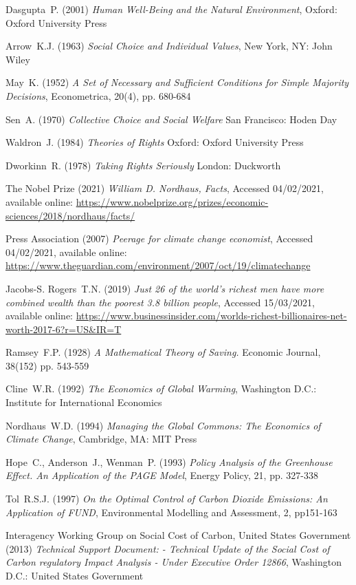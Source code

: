 \documentclass[11pt, oneside]{article}   	%
\begin{document}
\begin{thebibliography}{99}
 Dasgupta~P. (2001)
\emph{Human Well-Being and the Natural Environment},
Oxford: Oxford University Press
	
 Arrow~K.J. (1963)
\emph{Social Choice and Individual Values},
New York, NY: John Wiley
	
 May~K. (1952)
\emph{A Set of Necessary and Sufficient Conditions for Simple Majority Decisions},
Econometrica, 20(4), pp. 680-684
	
 Sen~A. (1970)
\emph{Collective Choice and Social Welfare}
San Francisco: Hoden Day
	
 Waldron~J. (1984)
\emph{Theories of Rights}
Oxford: Oxford University Press
	
 Dworkinn~R. (1978)
\emph{Taking Rights Seriously}
London: Duckworth
	
 The Nobel Prize (2021)
\emph{William D. Nordhaus, Facts},
Accessed 04/02/2021, available online: 
\url{https://www.nobelprize.org/prizes/economic-sciences/2018/nordhaus/facts/}
	
 Press Association (2007)
\emph{Peerage for climate change economist},
Accessed 04/02/2021, available online: 
\url{https://www.theguardian.com/environment/2007/oct/19/climatechange}
	
 Jacobs-S. Rogers~T.N. (2019)
\emph{Just 26 of the world's richest men have more combined wealth than the poorest 3.8 billion people},
Accessed 15/03/2021, available online: 
\url{https://www.businessinsider.com/worlds-richest-billionaires-net-worth-2017-6?r=US&IR=T}
	
 Ramsey~F.P. (1928)
\emph{A Mathematical Theory of Saving.}
Economic Journal, 38(152) pp. 543-559
	
 Cline~W.R. (1992)
\emph{The Economics of Global Warming},
Washington D.C.: Institute for International Economics
	
 Nordhaus~W.D. (1994)
\emph{Managing the Global Commons: The Economics of Climate Change},
Cambridge, MA: MIT Press
	
 Hope~C., Anderson~J., Wenman~P. (1993)
\emph{Policy Analysis of the Greenhouse Effect. An Application of the PAGE Model},
Energy Policy, 21, pp. 327-338
	
 Tol~R.S.J. (1997)
\emph{On the Optimal Control of Carbon Dioxide Emissions: An Application of FUND},
Environmental Modelling and Assessment, 2, pp151-163
	
 Interagency Working Group on Social Cost of Carbon, United States Government (2013)
\emph{Technical Support Document: - Technical Update of the Social Cost of Carbon regulatory Impact Analysis - Under Executive Order 12866},
Washington D.C.: United States Government
	

\end{thebibliography}
\end{document}
